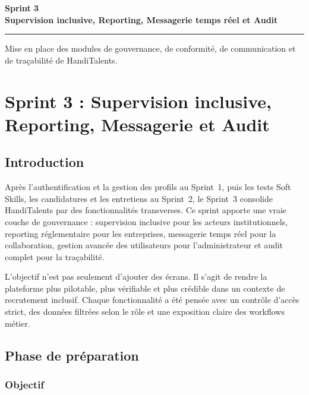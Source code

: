 \documentclass[12pt,a4paper]{report}
\begin{document}
\begin{titlepage}
  \centering
  \vspace*{3.4cm}
  {\Huge\bfseries\color{mainblue} Sprint 3 \\[0.4cm]
  Supervision inclusive, Reporting, Messagerie temps réel et Audit\par}
  \vspace{1.2cm}
  \rule{12cm}{0.7pt}
  \vspace{1.2cm}
  {\Large Mise en place des modules de gouvernance, de conformité,
  de communication et de traçabilité de HandiTalents.\par}
  \vfill
\end{titlepage}

\chapter{Sprint 3 : Supervision inclusive, Reporting, Messagerie et Audit}

\section{Introduction}

Après l'authentification et la gestion des profils au Sprint~1, puis les tests Soft Skills,
les candidatures et les entretiens au Sprint~2, le Sprint~3 consolide HandiTalents par des
fonctionnalités transverses. Ce sprint apporte une vraie couche de gouvernance : supervision
inclusive pour les acteurs institutionnels, reporting réglementaire pour les entreprises,
messagerie temps réel pour la collaboration, gestion avancée des utilisateurs pour
l'administrateur et audit complet pour la traçabilité.

L'objectif n'est pas seulement d'ajouter des écrans. Il s'agit de rendre la plateforme plus
pilotable, plus vérifiable et plus crédible dans un contexte de recrutement inclusif.
Chaque fonctionnalité a été pensée avec un contrôle d'accès strict, des données filtrées
selon le rôle et une exposition claire des workflows métier.

\section{Phase de préparation}

\subsection{Objectif}
\end{document}
